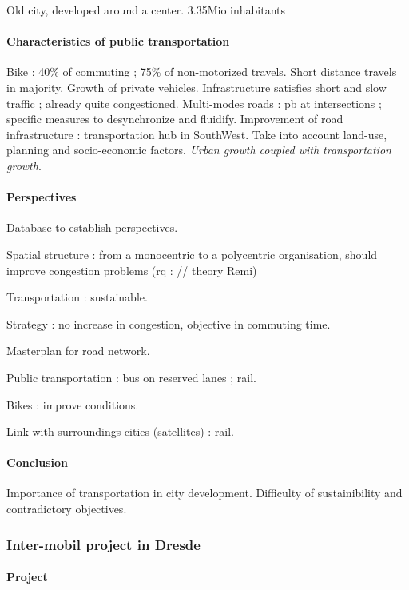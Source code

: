 Old city, developed around a center. 3.35Mio inhabitants

\paragraph{Characteristics of public transportation}

Bike : 40\% of commuting ; 75\% of non-motorized travels. Short distance travels in majority. Growth of private vehicles. Infrastructure satisfies short and slow traffic ; already quite congestioned. Multi-modes roads : pb at intersections ; specific measures to desynchronize and fluidify. Improvement of road infrastructure : transportation hub in SouthWest. Take into account land-use, planning and socio-economic factors. \textit{Urban growth coupled with transportation growth}.

\paragraph{Perspectives}

Database to establish perspectives.

Spatial structure : from a monocentric to a polycentric organisation, should improve congestion problems (rq : // theory Remi)

Transportation : sustainable.

Strategy : no increase in congestion, objective in commuting time.

Masterplan for road network.

Public transportation : bus on reserved lanes ; rail.

Bikes : improve conditions.

Link with surroundings cities (satellites) : rail.

\paragraph{Conclusion}

Importance of transportation in city development. Difficulty of sustainibility and contradictory objectives.

\subsubsection{Inter-mobil project in Dresde}

\paragraph{Project}

